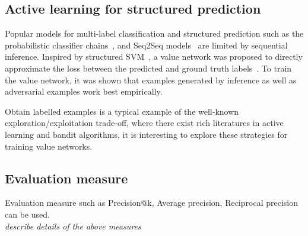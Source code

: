 \documentclass[9pt]{extarticle}
\newcommand{\1}{\mathbf{1}}
\begin{document}
\subsection*{Active learning for structured prediction}

Popular models for multi-label classification and structured prediction such as the probabilistic classifier chains~\cite{dembczynski:2010},
and Seq2Seq models~\cite{Vinyals:2017} are limited by sequential inference. 
Inspired by structured SVM~\cite{taskar2004max,tsochantaridis2004support}, 
a value network was proposed to directly approximate the loss between the predicted and ground truth labels~\cite{gygli17a}.
To train the value network, it was shown that examples generated by inference as well as adversarial examples work best empirically. 

Obtain labelled examples is a typical example of the well-known exploration/exploitation trade-off, where there exist rich literatures in active learning and bandit algorithms, it is interesting to explore these strategies for training value networks.



\subsection{Evaluation measure}
Evaluation measure such as Precision@k, Average precision, Reciprocal precision can be used.
\\ \emph{describe details of the above measures}

%
%


\end{document}
